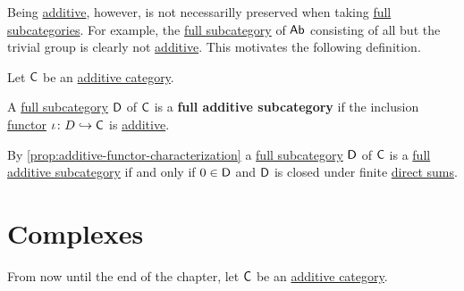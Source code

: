 \documentclass[../../main]{subfiles}
\begin{document}
Being \hyperref[def:additive-category]{additive}, however, is not necessarilly preserved when taking \hyperref[def:subcategory]{full subcategories}.
For example, the \hyperref[def:subcategory]{full subcategory} of \(\mathsf{Ab}\) consisting of all but the trivial group is clearly not \hyperref[def:additive-category]{additive}.
This motivates the following definition.
\begin{definition}\label{def:full-additive-subcategory}
  Let \(\mathsf{C}\) be an \hyperref[def:additive-category]{additive category}.

  A \hyperref[def:subcategory]{full subcategory} \(\mathsf{D}\) of \(\mathsf{C}\) is a \textbf{full additive subcategory} if the inclusion \hyperref[def:functor]{functor} \(\iota\colon D \hookrightarrow \mathsf{C}\) is \hyperref[def:additive-functor]{additive}.
\end{definition}

\begin{remark}
  By \autoref{prop:additive-functor-characterization} a \hyperref[def:subcategory]{full subcategory} \(\mathsf{D}\) of \(\mathsf{C}\) is a \hyperref[def:full-additive-subcategory]{full additive subcategory} if and only if \(0 \in \mathsf{D}\) and \(\mathsf{D}\) is closed under finite \hyperref[def:direct-sum]{direct sums}.
\end{remark}


\section{Complexes}

From now until the end of the chapter, let \(\mathsf{C}\) be an \hyperref[def:additive-category]{additive category}.
\end{document}
